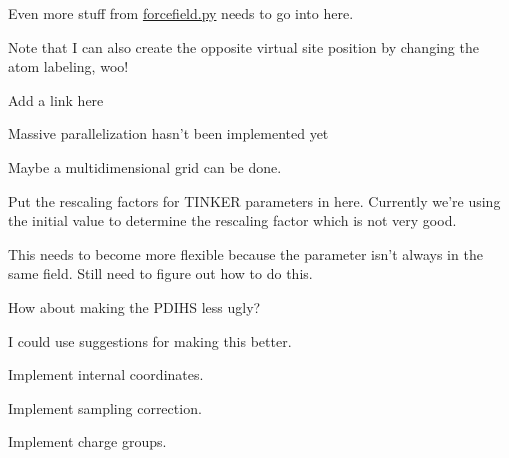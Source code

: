 \begin{DoxyRefList}
Even more stuff from \hyperlink{forcefield_8py}{forcefield.\-py} needs to go into here. 
\item[\label{todo__todo000011}%
\hypertarget{todo__todo000011}{}%
Class \hyperlink{classforcebalance_1_1gmxio_1_1ITP__Reader}{forcebalance.gmxio.I\-T\-P\-\_\-\-Reader} ]Note that I can also create the opposite virtual site position by changing the atom labeling, woo! 
\item[\label{todo__todo000014}%
\hypertarget{todo__todo000014}{}%
Member \hyperlink{classforcebalance_1_1openmmio_1_1OpenMM__Reader_ac89322d09d53425b5151f39306f4b38b}{forcebalance.openmmio.Open\-M\-M\-\_\-\-Reader.build\-\_\-pid} ]Add a link here  
\item[\label{todo__todo000015}%
\hypertarget{todo__todo000015}{}%
Member \hyperlink{classforcebalance_1_1optimizer_1_1Optimizer_a50ffc779fbba5a99085cba45d868fc29}{forcebalance.optimizer.Optimizer.Genetic\-Algorithm} ]Massive parallelization hasn't been implemented yet 
\item[\label{todo__todo000016}%
\hypertarget{todo__todo000016}{}%
Member \hyperlink{classforcebalance_1_1optimizer_1_1Optimizer_a6c7508252398ff7e00469c4c8acb0a48}{forcebalance.optimizer.Optimizer.Scan\-\_\-\-Values} ]Maybe a multidimensional grid can be done.  
\item[\label{todo__todo000018}%
\hypertarget{todo__todo000018}{}%
Member \hyperlink{classforcebalance_1_1tinkerio_1_1Tinker__Reader_a78df181e8a2ffea7054b1915e47384b7}{forcebalance.tinkerio.Tinker\-\_\-\-Reader.feed} ]Put the rescaling factors for T\-I\-N\-K\-E\-R parameters in here. Currently we're using the initial value to determine the rescaling factor which is not very good. 
\item[\label{todo__todo000010}%
\hypertarget{todo__todo000010}{}%
Member \hyperlink{namespaceforcebalance_1_1gmxio_ae845e0b923ecde16c79f2742b94534a6}{forcebalance\-:\-:gmxio.pdict} ]This needs to become more flexible because the parameter isn't always in the same field. Still need to figure out how to do this. 

How about making the P\-D\-I\-H\-S less ugly?  
\item[\label{todo__todo000013}%
\hypertarget{todo__todo000013}{}%
Member \hyperlink{namespaceforcebalance_1_1nifty_a8d63c8ae9a67c66673a6cf81357f827d}{forcebalance\-:\-:nifty.floatornan} ]I could use suggestions for making this better.  
\item[\label{todo__todo000017}%
\hypertarget{todo__todo000017}{}%
Member \hyperlink{namespaceforcebalance_1_1parser_ac184c809737a27f35530020322431f7c}{forcebalance\-:\-:parser.parse\-\_\-inputs} ]Implement internal coordinates. 

Implement sampling correction. 

Implement charge groups. 
\end{DoxyRefList}